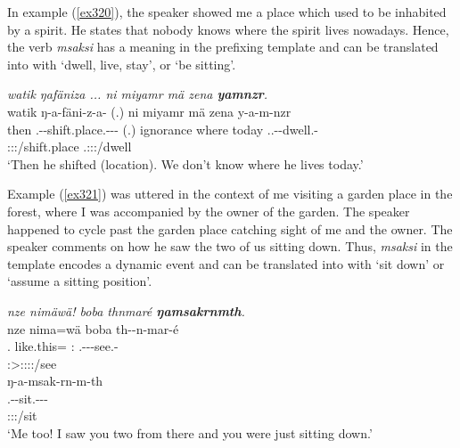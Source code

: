 In example (\ref{ex320}), the speaker showed me a place which used to be inhabited by a spirit. He states that nobody knows where the spirit lives nowadays. Hence, the verb \emph{msaksi} has a  meaning in the prefixing template and can be translated into  with `dwell, live, stay', or `be sitting'.

\begin{exe}
	\ex \emph{watik ŋafäniza ... ni miyamr mä zena \textbf{yamnzr}.}\\
	\glll watik ŋ-a-fäni-z-a-\Zero{} (.) ni miyamr mä zena y-a-m-nzr\\
	then \M.\Alph{}-\Vc-shift.place.\Ext-\Ndu-\Pst-\Stsg{} (.) \Fnsg{} ignorance where today \Tsg.\Masc.\Alph-\Vc-dwell.\Ext-\Ndu\\
	{} \footnotesize{\Stsg:\Sbj:\Ipfv:\Pst/shift.place} {} {} {} {} {} \footnotesize{\Tsg.\Masc:\Sbj:\Nonpast:\Ipfv/dwell}\\
	\trans `Then he shifted (location). We don't know where he lives today.'\\ 
	\label{ex320}
\end{exe}

Example (\ref{ex321}) was uttered in the context of me visiting a garden place in the forest, where I was accompanied by the owner of the garden. The speaker happened to cycle past the garden place catching sight of me and the owner. The speaker comments on how he saw the two of us sitting down. Thus, \emph{msaksi} in the  template encodes a dynamic event and can be translated into  with `sit down' or `assume a sitting position'.

\begin{exe}
	\ex \emph{nze nimäwä! boba thnmaré \textbf{ŋamsakrnmth}.}\\
	\glll nze nima=wä boba th-\Zero{}-n-mar-é\\
	\Fsg.\Erg{} like.this=\Emph{} \Med:\Abl{} \Stnsg.\Gam-\Du-\Venit-see.\Rs-\Fsg{}\\
	{} {} {} \footnotesize{\Fsg:\Sbj>\Stdu:\Obj:\Rpst:\Pfv:\Venit/see}\\
	\sn
	\glll ŋ-a-msak-rn-m-th\\
	\M.\Alph-\Vc-sit.\Ext-\Du-\Dur-\Stnsg{}\\
	\footnotesize{\Stdu:\Sbj:\Rpst:\Dur/sit}\\
	\trans `Me too! I saw you two from there and you were just sitting down.'\\ 
	\label{ex321}
\end{exe}


